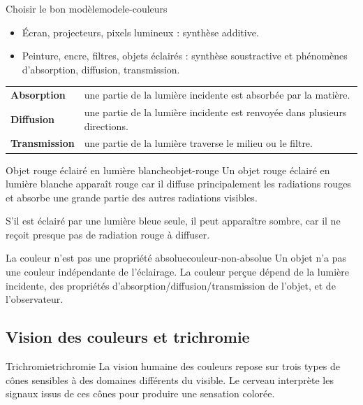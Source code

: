 \documentclass[11pt,a4paper]{article}
\begin{document}
\begin{retenirbox}{Choisir le bon modèle}{modele-couleurs}
\begin{itemize}
  \item Écran, projecteurs, pixels lumineux : synthèse additive.
  \item Peinture, encre, filtres, objets éclairés : synthèse soustractive et phénomènes d'absorption, diffusion, transmission.
\end{itemize}
\end{retenirbox}

\begin{tabularx}{\textwidth}{>{\bfseries}lX}
Absorption & une partie de la lumière incidente est absorbée par la matière.\\
Diffusion & une partie de la lumière incidente est renvoyée dans plusieurs directions.\\
Transmission & une partie de la lumière traverse le milieu ou le filtre.\\
\end{tabularx}

\begin{examplebox}{Objet rouge éclairé en lumière blanche}{objet-rouge}
Un objet rouge éclairé en lumière blanche apparaît rouge car il diffuse principalement les radiations rouges et absorbe une grande partie des autres radiations visibles.

S'il est éclairé par une lumière bleue seule, il peut apparaître sombre, car il ne reçoit presque pas de radiation rouge à diffuser.
\end{examplebox}

\begin{warningbox}{La couleur n'est pas une propriété absolue}{couleur-non-absolue}
Un objet n'a pas une couleur indépendante de l'éclairage. La couleur perçue dépend de la lumière incidente, des propriétés d'absorption/diffusion/transmission de l'objet, et de l'observateur.
\end{warningbox}

\subsection{Vision des couleurs et trichromie}

\begin{definitionbox}{Trichromie}{trichromie}
La vision humaine des couleurs repose sur trois types de cônes sensibles à des domaines différents du visible. Le cerveau interprète les signaux issus de ces cônes pour produire une sensation colorée.
\end{definitionbox}
\end{document}
